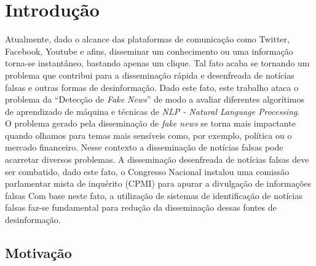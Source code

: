 \section{Introdução}

Atualmente, dado o alcance das plataformas de comunicação como Twitter, Facebook, Youtube e afins, disseminar um conhecimento ou uma informação torna-se instantâneo, bastando apenas um clique. 
Tal fato acaba se tornando um problema que contribui para a disseminação rápida e desenfreada de notícias falsas e outras formas de desinformação. 
Dado este fato, este trabalho ataca o problema da ``Detecção de \textit{Fake News}''\cite{ZHANG2020102025} de modo a avaliar diferentes algorítimos de aprendizado de máquina e técnicas de \textit{NLP - \textit{Natural Language Processing}}. \\


O problema gerado pela disseminação de \textit{fake news} se torna mais impactante quando olhamos para temas mais sensíveis como, por exemplo, política ou o mercado financeiro.
Nesse contexto a disseminação de notícias falsas pode acarretar diversos problemas. 
A disseminação desenfreada de notícias falsas deve ser combatido, dado este fato, o Congresso Nacional instalou uma comissão parlamentar mista de inquérito (CPMI)  para apurar a divulgação de informações falsas 
\cite{g12019}
Com base neste fato, a utilização de sistemas de identificação de notícias falsas faz-se fundamental para redução da disseminação dessas fontes de desinformação.



\subsection{Motivação}


